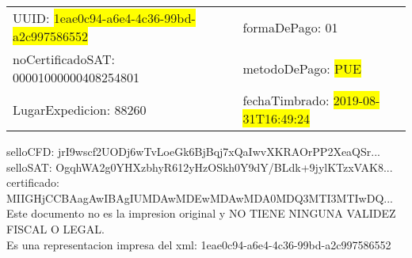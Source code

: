 \documentclass{article}
\begin{document}
\begin{tabular}{p{11cm}p{1cm}p{8cm}}
\bigskip
UUID: \colorbox{yellow}{ 1eae0c94-a6e4-4c36-99bd-a2c997586552 } & & formaDePago: 01\\

noCertificadoSAT: 00001000000408254801 & & metodoDePago: \colorbox{yellow}{ PUE }\\

LugarExpedicion: 88260 & & fechaTimbrado: \colorbox{yellow}{ 2019-08-31T16:49:24 } \\
\end{tabular}

\bigskip
selloCFD: jrI9wscf2UODj6wTvLoeGk6BjBqj7xQaIwvXKRAOrPP2XeaQSr... \\
selloSAT: OgqhWA2g0YHXzbhyR612yHzOSkh0Y9dY/BLdk+9jylKTzxVAK8... \\

certificado: MIIGHjCCBAagAwIBAgIUMDAwMDEwMDAwMDA0MDQ3MTI3MTIwDQ...\bigskip\bigskip\bigskip\bigskip\bigskip\bigskip
\\Este documento no es la impresion original y NO TIENE NINGUNA VALIDEZ FISCAL O LEGAL. \\
 Es una representacion impresa del xml:  1eae0c94-a6e4-4c36-99bd-a2c997586552 \\
\end{document}

